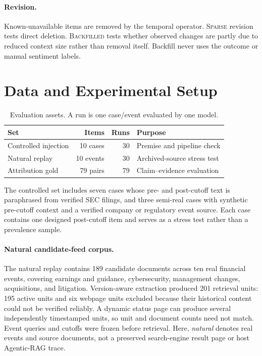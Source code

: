 \documentclass[10pt,twocolumn]{article}
\newcommand{\sparse}{\textsc{Sparse}}
\newcommand{\backfill}{\textsc{Backfilled}}
\begin{document}
\paragraph{Revision.}
Known-unavailable items are removed by the temporal operator. \sparse{} revision
tests direct deletion. \backfill{} tests whether observed changes are partly due to
reduced context size rather than removal itself. Backfill never uses the outcome or
manual sentiment labels.

\section{Data and Experimental Setup}

\begin{table}[t]
\centering
\small
\begin{tabularx}{\columnwidth}{@{}lrrY@{}}
\toprule
Set & Items & Runs & Purpose \\
\midrule
Controlled injection & 10 cases & 30 & Premise and pipeline check \\
Natural replay & 10 events & 30 & Archived-source stress test \\
Attribution gold & 79 pairs & 79 & Claim--evidence evaluation \\
\bottomrule
\end{tabularx}
\caption{Evaluation assets. A run is one case/event evaluated by one model.}
\label{tab:data}
\end{table}

The controlled set includes seven cases whose pre- and post-cutoff text is paraphrased
from verified SEC filings, and three semi-real cases with synthetic pre-cutoff context
and a verified company or regulatory event source. Each case contains one designed
post-cutoff item and serves as a stress test rather than a prevalence sample.

\paragraph{Natural candidate-feed corpus.}
The natural replay contains 189 candidate documents across ten real financial events,
covering earnings and guidance, cybersecurity, management changes, acquisitions, and
litigation. Version-aware extraction produced 201 retrieval units: 195 active units
and six webpage units excluded because their historical content could not be verified
reliably. A dynamic status page can produce several independently timestamped units,
so unit and document counts need not match. Event queries and cutoffs were frozen
before retrieval. Here, \emph{natural} denotes real events and source documents, not a
preserved search-engine result page or host Agentic-RAG trace.
\end{document}
